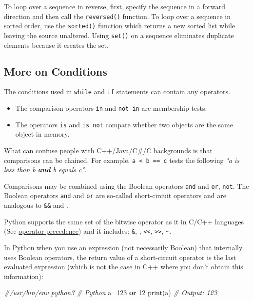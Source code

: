 \documentclass[
]{article}
\newenvironment{Shaded}{}{}
\newcommand{\BuiltInTok}[1]{#1}
\newcommand{\CommentTok}[1]{\textcolor[rgb]{0.38,0.63,0.69}{\textit{#1}}}
\newcommand{\DecValTok}[1]{\textcolor[rgb]{0.25,0.63,0.44}{#1}}
\newcommand{\KeywordTok}[1]{\textcolor[rgb]{0.00,0.44,0.13}{\textbf{#1}}}
\newcommand{\NormalTok}[1]{#1}
\newcommand{\OperatorTok}[1]{\textcolor[rgb]{0.40,0.40,0.40}{#1}}
\begin{document}
To loop over a sequence in reverse, first, specify the sequence in a
forward direction and then call the \texttt{reversed()} function. To
loop over a sequence in sorted order, use the \texttt{sorted()} function
which returns a new sorted list while leaving the source unaltered.
Using \texttt{set()} on a sequence eliminates duplicate elements because
it creates the set.

\hypertarget{more-on-conditions}{%
\subsection{More on Conditions}\label{more-on-conditions}}

The conditions used in \texttt{while} and \texttt{if} statements can
contain any operators.

\begin{itemize}
\item
  The comparison operators \texttt{in} and \texttt{not\ in} are
  membership tests.
\item
  The operators \texttt{is} and \texttt{is\ not} compare whether two
  objects are the same object in memory.
\end{itemize}

What can confuse people with C++/Java/C\#/C backgrounds is that
comparisons can be chained. For example,
\texttt{a\ \textless{}\ b\ ==\ c} tests the following \emph{"a is less
than b \textbf{and} b equals c"}.

Comparisons may be combined using the Boolean operators \texttt{and} and
\texttt{or}, \texttt{not}. The Boolean operators \texttt{and} and
\texttt{or} are so-called short-circuit operators and are analogous to
\texttt{\&\&} and \texttt{\textbar{}\textbar{}}.

Python supports the same set of the bitwise operator as it in C/C++
languages (See
\href{https://docs.python.org/3.13/reference/expressions.html\#operator-precedence}{operator
precedence}) and it includes: \texttt{\&}, \texttt{\textbar{}},
\texttt{\textless{}\textless{}}, \texttt{\textgreater{}\textgreater{}},
\texttt{\textasciitilde{}}.

In Python when you use an expression (not necessarily Boolean) that
internally uses Boolean operators, the return value of a short-circuit
operator is the last evaluated expression (which is not the case in C++
where you don't obtain this information):

\begin{Shaded}
\begin{Highlighting}[]
\CommentTok{\#/usr/bin/env python3}
\CommentTok{\# Python}
\NormalTok{a}\OperatorTok{=}\DecValTok{123} \KeywordTok{or} \DecValTok{12}
\BuiltInTok{print}\NormalTok{(a)}
\CommentTok{\# Output: 123}
\end{Highlighting}
\end{Shaded}
\end{document}
